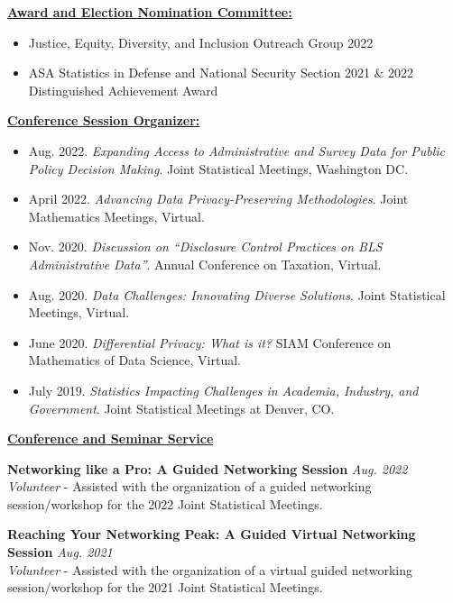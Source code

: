 \documentclass[11pt, letterpaper, roman]{moderncv} %
\newcommand{\professionalspace}{\vspace{8pt}}
\newcommand{\outreachspace}{\vspace{5pt}}
\begin{document}
\professionalspace
\underline{\textbf{\large Award and Election Nomination Committee:}}\normalsize

\begin{itemize}
    \item Justice, Equity, Diversity, and Inclusion Outreach Group \hfill 2022
    \item ASA Statistics in Defense and National Security Section \hfill 2021 \& 2022\\ Distinguished Achievement Award
\end{itemize}

\newpage
\underline{\textbf{\large Conference Session Organizer:}}\normalsize

\begin{itemize}\setlength\itemsep{2pt}
    \item Aug. 2022. \textit{Expanding Access to Administrative and Survey Data for Public Policy Decision Making}. Joint Statistical Meetings, Washington DC. 
    \item April 2022. \textit{Advancing Data Privacy-Preserving Methodologies}. Joint Mathematics Meetings, Virtual.  
     \item Nov. 2020. \textit{Discussion on ``Disclosure Control Practices on BLS Administrative Data''}. Annual Conference on Taxation, Virtual.   
    \item Aug. 2020. \textit{Data Challenges: Innovating Diverse Solutions}. Joint Statistical Meetings, Virtual.
    \item June 2020. \textit{Differential Privacy: What is it?} SIAM Conference on Mathematics of Data Science, Virtual.
    \item July 2019. \textit{Statistics Impacting Challenges in Academia, Industry, and Government}. Joint Statistical Meetings at Denver, CO.
\end{itemize}

\professionalspace
\underline{\textbf{\large Conference and Seminar Service}}\normalsize

\outreachspace
\textbf{Networking like a Pro: A Guided Networking Session} \hfill \textit{Aug. 2022}\\
\textit{Volunteer} - Assisted with the organization of a guided networking session/workshop for the 2022 Joint Statistical Meetings.

\outreachspace
\textbf{Reaching Your Networking Peak: A Guided Virtual Networking Session} \hfill \textit{Aug. 2021}\\
\textit{Volunteer} - Assisted with the organization of a virtual guided networking session/workshop for the 2021 Joint Statistical Meetings.
\end{document}
